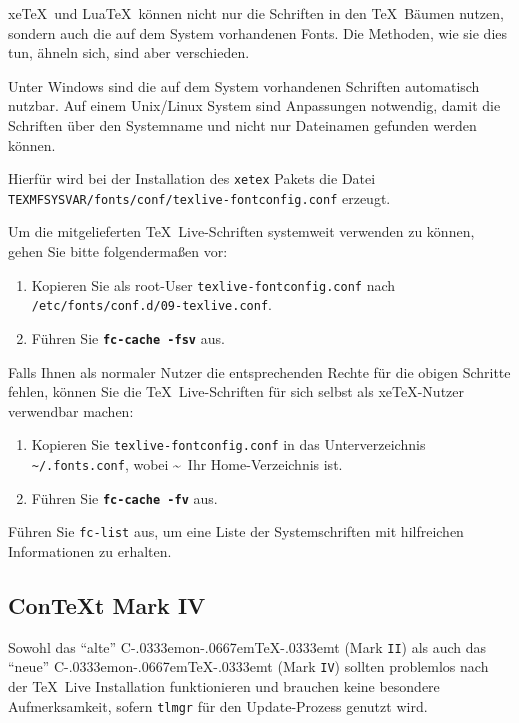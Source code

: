 \documentclass[12pt,ngerman,a4paper,fullparskip]{report}
\newcommand{\TL}{\TeX\ Live\xspace}
\newcommand{\acro}[1]{\texttt{#1}}
\newcommand{\code}[1]{\texttt{#1}}
\newcommand{\filename}[1]{\texttt{#1}}
\newcommand{\dirname}[1]{\texttt{#1}}
\newcommand{\Ucom}[1]{\textbf{\texttt{#1}}}
\newcommand\ConTeXt{C\kern-.0333emon\-\kern-.0667em\TeX\kern-.0333emt}
\providecommand*{\XeTeX}{xe\TeX\xspace}
\begin{document}
\XeTeX\  und Lua\TeX\ können nicht nur die Schriften in den \TeX\ Bäumen nutzen, sondern auch die auf dem System vorhandenen Fonts. Die Methoden, wie sie dies tun, ähneln sich, sind aber verschieden.

Unter Windows sind die auf dem System vorhandenen Schriften automatisch nutzbar. Auf einem Unix/Linux System sind Anpassungen notwendig, damit die Schriften über den Systemname und nicht nur Dateinamen gefunden werden können.

Hierfür wird bei der Installation des \filename{xetex} Pakets die Datei \newline  \filename{TEXMFSYSVAR/fonts/conf/texlive-fontconfig.conf}
erzeugt.

Um die mitgelieferten \TL-Schriften systemweit verwenden zu können,
gehen Sie bitte folgendermaßen vor:

\begin{enumerate}
\item Kopieren Sie als root-User \filename{texlive-fontconfig.conf} nach \newline
\dirname{/etc/fonts/conf.d/09-texlive.conf}.
\item Führen Sie \Ucom{fc-cache -fsv} aus. 
\end{enumerate}

\noindent Falls Ihnen als normaler Nutzer die entsprechenden Rechte für die
obigen Schritte fehlen, können Sie die \TL-Schriften für sich selbst
als \XeTeX-Nutzer verwendbar machen:

\begin{enumerate}
\item Kopieren Sie \filename{texlive-fontconfig.conf} in das Unterverzeichnis
      \filename{\textasciitilde/.fonts.conf}, wobei \textasciitilde\ Ihr Home-Verzeichnis ist.
\item Führen Sie \Ucom{fc-cache -fv} aus.
\end{enumerate}

Führen Sie \code{fc-list} aus, um eine Liste der Systemschriften mit hilfreichen Informationen zu erhalten.

\subsection{Con\TeX t Mark IV}
\label{sec:context-mkiv}

Sowohl das \enquote{alte} \ConTeXt{} (Mark \acro{II}) als auch das \enquote{neue} \ConTeXt{} (Mark \acro{IV}) sollten problemlos nach der \TL{} Installation funktionieren und brauchen keine besondere Aufmerksamkeit, sofern \verb+tlmgr+ für den Update-Prozess genutzt wird.
\end{document}

